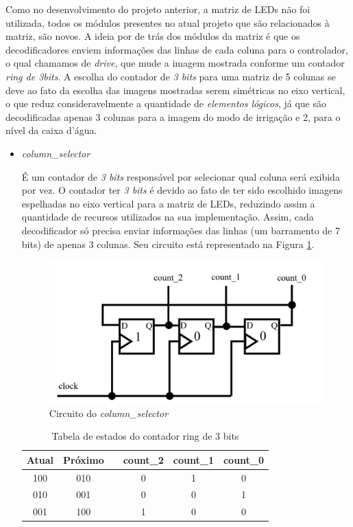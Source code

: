\documentclass[
	article,			%
	11pt,				%
	oneside,			%
	a4paper,			%
	english,			%
	brazil,				%
	sumario=tradicional
	]{abntex2}
\begin{document}
Como no desenvolvimento do projeto anterior, a matriz de LEDs não foi utilizada, todos os módulos presentes no atual projeto que são relacionados à matriz, são novos. A ideia por de trás dos módulos da matriz é que os decodificadores enviem informações das linhas de cada coluna para o controlador, o qual chamamos de \textit{drive}, que mude a imagem mostrada conforme um contador \textit{ring de 3bits}. A escolha do contador de \textit{3 bits} para uma matriz de 5 colunas se deve ao fato da escolha das imagens mostradas serem simétricas no eixo vertical, o que reduz consideravelmente a quantidade de \textit{elementos lógicos}, já que são decodificadas apenas 3 colunas para a imagem do modo de irrigação e 2, para o nível da caixa d'água.

\begin{itemize}
    \item \textit{column\_selector}
    
É um contador de \textit{3 bits} responsável por selecionar qual coluna será exibida por vez. O contador ter \textit{3 bits} é devido ao fato de ter sido escolhido imagens espelhadas no eixo vertical para a matriz de LEDs, reduzindo assim a quantidade de recursos utilizados na sua implementação.  Assim, cada decodificador só precisa enviar informações das linhas (um barramento de 7 bits) de apenas 3 colunas. Seu circuito está representado na Figura \ref{fig:column_selector}.

\begin{figure}[H]
    \centering
    \includegraphics[width=0.5\linewidth]{column_selector.png}
    \caption{Circuito do \textit{column\_selector}}
    \label{fig:column_selector}
\end{figure}
\begin{table}[H]
    \centering
    \begin{tabular}{|c|c|>{\centering\arraybackslash}p{2mm}|c|c|c|} \hline 
         Atual&  Próximo&  & count_2& count_1&count_0\\ \hline 
         100&  010&  & 0& 1&0\\ \hline 
         010&  001&  & 0& 0&1\\ \hline 
         001&  100&  & 1& 0&0\\\hline
    \end{tabular}
    \caption{Tabela de estados do contador ring de 3 bits}
    \label{tab:3bits-ring}
\end{table}


\end{itemize}
\end{document}
